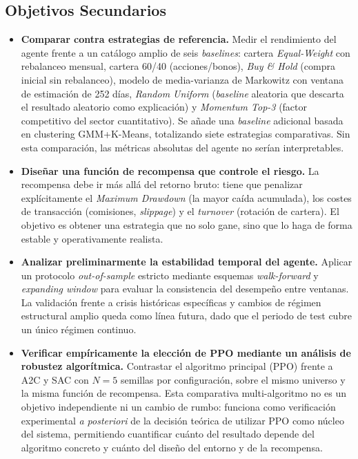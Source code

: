 \documentclass[IB,a4paper]{TFUOC}
\begin{document}
\subsection{Objetivos Secundarios}
\begin{itemize}
    \item \textbf{Comparar contra estrategias de referencia.} Medir el rendimiento del agente frente a un catálogo amplio de seis \textit{baselines}: cartera \textit{Equal-Weight} con rebalanceo mensual, cartera 60/40 (acciones/bonos), \textit{Buy \& Hold} (compra inicial sin rebalanceo), modelo de media-varianza de Markowitz con ventana de estimación de 252 días, \textit{Random Uniform} (\textit{baseline} aleatoria que descarta el resultado aleatorio como explicación) y \textit{Momentum Top-3} (factor competitivo del sector cuantitativo). Se añade una \textit{baseline} adicional basada en clustering GMM+K-Means, totalizando siete estrategias comparativas. Sin esta comparación, las métricas absolutas del agente no serían interpretables.
    \item \textbf{Diseñar una función de recompensa que controle el riesgo.} La recompensa debe ir más allá del retorno bruto: tiene que penalizar explícitamente el \textit{Maximum Drawdown} (la mayor caída acumulada), los costes de transacción (comisiones, \textit{slippage}) y el \textit{turnover} (rotación de cartera). El objetivo es obtener una estrategia que no solo gane, sino que lo haga de forma estable y operativamente realista.
    \item \textbf{Analizar preliminarmente la estabilidad temporal del agente.} Aplicar un protocolo \textit{out-of-sample} estricto mediante esquemas \textit{walk-forward} y \textit{expanding window} para evaluar la consistencia del desempeño entre ventanas. La validación frente a crisis históricas específicas y cambios de régimen estructural amplio queda como línea futura, dado que el periodo de test cubre un único régimen continuo.
    \item \textbf{Verificar empíricamente la elección de PPO mediante un análisis de robustez algorítmica.} Contrastar el algoritmo principal (PPO) frente a A2C y SAC con $N=5$ semillas por configuración, sobre el mismo universo y la misma función de recompensa. Esta comparativa multi-algoritmo no es un objetivo independiente ni un cambio de rumbo: funciona como verificación experimental \textit{a posteriori} de la decisión teórica de utilizar PPO como núcleo del sistema, permitiendo cuantificar cuánto del resultado depende del algoritmo concreto y cuánto del diseño del entorno y de la recompensa.
\end{itemize}
\end{document}
